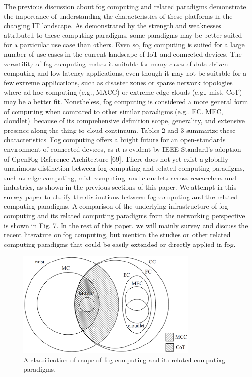The previous discussion about fog computing and related paradigms demonstrate the importance of understanding the characteristics of these platforms in the changing IT landscape. As demonstrated by the strength and weaknesses attributed to these computing paradigms, some paradigms may be better suited for a particular
use case than others. Even so, fog computing is suited for a large number of use cases in the current landscape of IoT and connected devices. The versatility of fog computing makes it suitable for many cases of data-driven computing and low-latency applications, even though it may not be suitable for a few extreme applications, such as disaster zones or sparse network topologies where ad hoc computing (e.g., MACC) or extreme edge clouds (e.g., mist, CoT) may be a better fit. Nonetheless, fog computing is considered a more general form of computing when compared to other similar paradigms (e.g., EC, MEC, cloudlet), because of its comprehensive definition scope, generality, and extensive presence along the thing-to-cloud continuum. Tables 2 and 3 summarize these characteristics. Fog computing offers a bright future for an open-standards environment of connected devices, as it is evident by IEEE Standard’s adoption of OpenFog Reference Architecture [69]. There does not yet exist a globally unanimous distinction between fog computing and related computing paradigms, such as edge computing, mist computing, and cloudlets across researchers and industries, as shown in the previous sections of this paper. We attempt in this survey paper to clarify the distinctions between fog computing and the related computing paradigms. A comparison of the underlying infrastructure of fog computing and its related computing paradigms from the networking perspective is shown in Fig. 7. In the rest of this paper, we will mainly survey and discuss the recent literature on fog computing, but mention the studies on other related computing paradigms that could be easily extended or directly applied in fog.

\begin{figure}
	\centering
	\includegraphics[width=90mm]{images/computing_paradigms}
	\caption{A classification of scope of fog computing and its related computing paradigms.}
	\label{architecture}
\end{figure}


